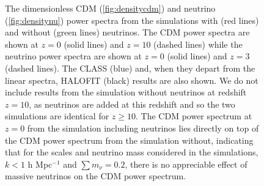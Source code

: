 \documentclass[twocolumn,superscriptaddress,prd]{revtex4}
\newcommand{\halofit}{HALOFIT }
\begin{document}
\begin{figure}[h!]
  \centering
  \caption{
    The dimensionless CDM
    (\ref{fig:densitycdm}) and neutrino (\ref{fig:densitynu}) power
      spectra  from the
     simulations with (red lines) and without (green lines) neutrinos.  
    The CDM power spectra are shown at $z=0$ (solid lines)
     and $z=10$ (dashed lines) while the neutrino power spectra are shown
     at $z=0$ (solid lines) and $z=3$ (dashed lines).  
     The CLASS (blue) and, when they depart from the linear spectra, 
     \halofit (black) results are also shown.  
      We do not include results from the simulation without neutrinos
      at redshift $z=10$, as neutrinos are added at this redshift
      and so the two simulations are identical for $z\ge10$.  The CDM 
      power spectrum at $z=0$ from the simulation including
      neutrinos lies directly on top of the 
      CDM power spectrum from the simulation without, 
indicating that for the scales and neutrino
      mass considered in the simulations, $k<1$ h Mpc$^{-1}$ and $\textstyle\sum m_\nu
    = 0.2$, there is no appreciable effect of massive neutrinos on the
    CDM power spectrum.
}
\end{figure}
\end{document}
